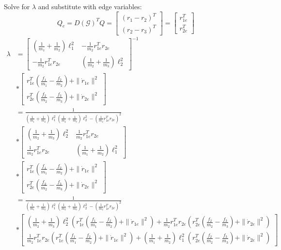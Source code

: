 \documentclass[conference]{IEEEtran}
\begin{document}
Solve for $\lambda$ and substitute with edge variables:
$$Q_e=D(\mathcal{G})^TQ=\begin{bmatrix}
    (r_1-r_2)^T\\
    (r_2-r_3)^T
\end{bmatrix}=\begin{bmatrix}
    r_{1e}^T\\
    r_{2e}^T
\end{bmatrix}$$
\begin{align*}
    \lambda&=\begin{bmatrix}
        \left(\frac{1}{m_1}+\frac{1}{m_2}\right)\ell_1^2 & -\frac{1}{m_2}r_{1e}^Tr_{2e}\\
        -\frac{1}{m_2}r_{1e}^Tr_{2e} & \left(\frac{1}{m_2}+\frac{1}{m_3}\right)\ell_2^2
    \end{bmatrix}^{-1}\\
    &*\begin{bmatrix}
        r_{1e}^T\left(\frac{f_1}{m_1}-\frac{f_2}{m_2}\right)+\|\dot{r}_{1e}\|^2\\
        r_{2e}^T\left(\frac{f_2}{m_2}-\frac{f_3}{m_3}\right)+\|\dot{r}_{2e}\|^2
    \end{bmatrix}\\
    &=\frac{1}{\left(\frac{1}{m_1}+\frac{1}{m_2}\right)\ell_1^2\left(\frac{1}{m_2}+\frac{1}{m_3}\right)\ell_2^2-\left(\frac{1}{m_2}r_{1e}^Tr_{2e}\right)^2}\\
    &*\begin{bmatrix}
        \left(\frac{1}{m_2}+\frac{1}{m_3}\right)\ell_2^2 & \frac{1}{m_2}r_{1e}^Tr_{2e}\\
        \frac{1}{m_2}r_{1e}^Tr_{2e} & \left(\frac{1}{m_1}+\frac{1}{m_2}\right)\ell_1^2
    \end{bmatrix}\\
    &*\begin{bmatrix}
        r_{1e}^T\left(\frac{f_1}{m_1}-\frac{f_2}{m_2}\right)+\|\dot{r}_{1e}\|^2\\
        r_{2e}^T\left(\frac{f_2}{m_2}-\frac{f_3}{m_3}\right)+\|\dot{r}_{2e}\|^2
    \end{bmatrix}\\
    &=\frac{1}{\left(\frac{1}{m_1}+\frac{1}{m_2}\right)\ell_1^2\left(\frac{1}{m_2}+\frac{1}{m_3}\right)\ell_2^2-\left(\frac{1}{m_2}r_{1e}^Tr_{2e}\right)^2}\\
    &*\begin{bmatrix}
        \left(\frac{1}{m_2}+\frac{1}{m_3}\right)\ell_2^2\left(r_{1e}^T\left(\frac{f_1}{m_1}-\frac{f_2}{m_2}\right)+\|\dot{r}_{1e}\|^2\right) + \frac{1}{m_2}r_{1e}^Tr_{2e}\left(r_{2e}^T\left(\frac{f_2}{m_2}-\frac{f_3}{m_3}\right)+\|\dot{r}_{2e}\|^2\right)\\
        \frac{1}{m_2}r_{1e}^Tr_{2e}\left(r_{1e}^T\left(\frac{f_1}{m_1}-\frac{f_2}{m_2}\right)+\|\dot{r}_{1e}\|^2\right) + \left(\frac{1}{m_1}+\frac{1}{m_2}\right)\ell_1^2\left(r_{2e}^T\left(\frac{f_2}{m_2}-\frac{f_3}{m_3}\right)+\|\dot{r}_{2e}\|^2\right)
    \end{bmatrix}
\end{align*}
\end{document}
